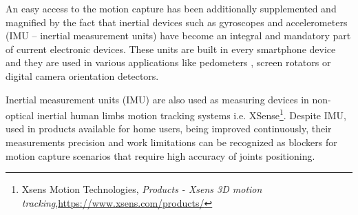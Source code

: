 \documentclass[sensors,article,submit,moreauthors,pdftex,10pt,a4paper]{mdpi}
\begin{document}
An easy access to the motion capture has been additionally supplemented and magnified by the fact that inertial devices such as gyroscopes and accelerometers (IMU – inertial measurement units) have become an integral and mandatory part of current electronic devices. These units are built in every smartphone device and they are used in various applications like pedometers \cite{Huang2012, Jayalath2013}, screen rotators \cite{Pedley2013} or digital camera orientation detectors.

Inertial measurement units (IMU) are also used as measuring devices in non-optical inertial human limbs motion tracking systems i.e. XSense\footnote{Xsens Motion Technologies, \textit{Products - Xsens 3D motion tracking},\url{https://www.xsens.com/products/}}. Despite IMU, used in products available for home users, being improved continuously, their measurements precision and work limitations can be recognized as blockers for motion capture scenarios that require high accuracy of joints positioning.\\%
\end{document}
